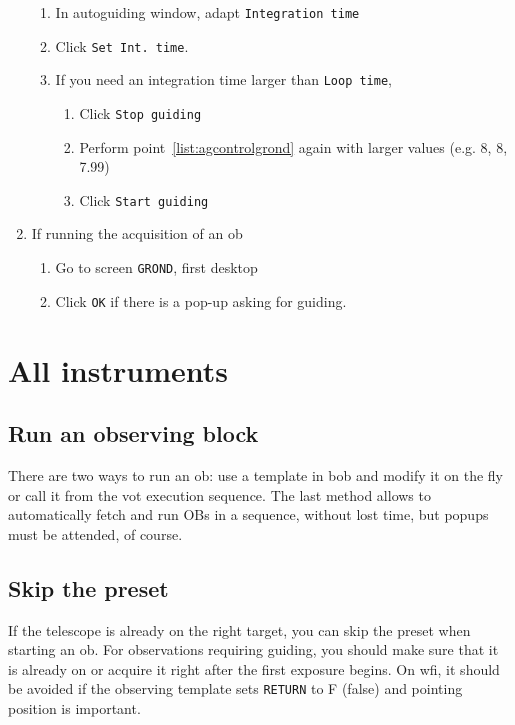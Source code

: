 \documentclass[11pt,fleqn,a4paper]{book}
\begin{document}
\begin{enumerate}
\begin{enumerate}
        \item In \gls{autoguiding} window, adapt \texttt{Integration time}
        \item Click \texttt{Set Int. time}. 
        \item If you need an integration time larger than \texttt{Loop time},
            \begin{enumerate}
                \item Click \texttt{Stop guiding}
                \item Perform point~\ref{list:agcontrolgrond} again with larger values (e.g. 8, 8, 7.99)
                \item Click \texttt{Start guiding}
            \end{enumerate}
    \end{enumerate}
    \item If running the \gls{acquisition} of an \gls{ob}
    \begin{enumerate}
        \item Go to screen \texttt{GROND}, first \gls{desktop}
        \item Click \texttt{OK} if there is a pop-up asking for guiding.
    \end{enumerate}
\end{enumerate}

\section{All instruments}

\subsection{Run an observing block}

There are two ways to run an \gls{ob}: use a \gls{template} in \gls{bob} and modify it on the fly or call it from the \gls{vot} execution sequence.  The last method allows to automatically fetch and run OBs in a sequence, without lost time, but popups must be attended, of course.


\subsection{Skip the preset}

If the telescope is already on the right target, you can skip the \gls{preset}
when starting an \gls{ob}. For observations requiring guiding, you should make sure
that it is already on or acquire it right after the first exposure begins.  On
\gls{wfi}, it should be avoided if the observing \gls{template} sets \texttt{RETURN}
to F (false) and \gls{pointing} position is important.
\end{document}
